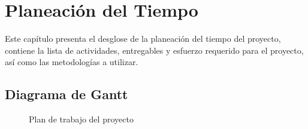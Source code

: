 \chapter{Planeación del Tiempo}	
\label{cap:tiempo}

	Este capítulo presenta el desglose de la planeación del tiempo del proyecto, contiene la lista de actividades, entregables y esfuerzo requerido para el proyecto, así como las metodologías a utilizar.

\section{Diagrama de Gantt}

\begin{figure}[htbp!]
	\begin{center}
		\caption{Plan de trabajo del proyecto}
		\label{fig:plan}
	\end{center}
\end{figure}

